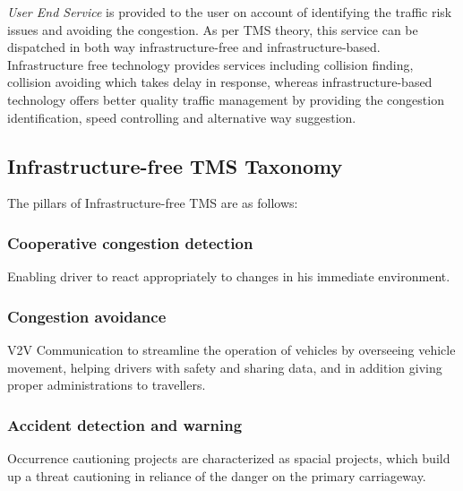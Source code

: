 \documentclass[conference]{IEEEtran}
\begin{document}
\textit{User End Service} is provided to the user on account of identifying the traffic risk issues and avoiding the congestion. As per TMS theory, this service can be dispatched in both way infrastructure-free and infrastructure-based. Infrastructure free technology provides services including collision finding, collision avoiding which takes delay in response, whereas infrastructure-based technology offers better quality traffic management by providing the congestion identification, speed controlling and alternative way suggestion.

\subsection{Infrastructure-free TMS Taxonomy}
The pillars of Infrastructure-free TMS are as follows: 
\subsubsection{Cooperative congestion detection}
Enabling driver to react appropriately to changes in his immediate environment.
\subsubsection{Congestion avoidance}
V2V Communication  to streamline the operation of vehicles by overseeing vehicle movement, helping drivers with safety and sharing data, and in addition giving proper administrations to travellers.
\subsubsection{Accident detection and warning}
Occurrence cautioning projects are characterized as spacial projects, which build up a threat cautioning in reliance of the danger on the primary carriageway.
\end{document}
